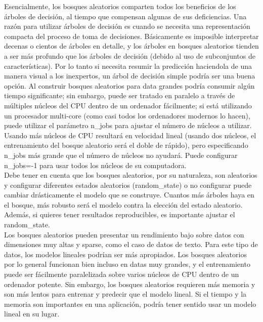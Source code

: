 { 
 Esencialmente, los bosques aleatorios comparten todos los beneficios de los árboles de decisión, al tiempo que compensan algunas de sus deficiencias.  Una razón para  utilizar árboles de decisión es cuando se necesita una representación compacta del proceso de toma de decisiones.  Básicamente es imposible interpretar decenas o cientos de árboles en detalle, y los árboles en bosques aleatorios tienden a ser más profundo que los árboles de decisión (debido al uso de subconjuntos de características).  Por lo tanto si necesita resumir la predicción haciendola de una manera visual a los inexpertos, un árbol de decisión simple podría ser una buena opción.   Al construir bosques aleatorios para data grandes podría consumir algún  tiempo significante; sin embargo, puede ser tratado en paralelo a través de múltiples núcleos del CPU dentro de un ordenador fácilmente;  si está utilizando un procesador multi-core (como casi todos los ordenadores modernos lo hacen), puede utilizar el parámetro {\ttfamily n\_jobs} para ajustar el número de núcleos a utilizar. Usando más núcleos de CPU resultará en velocidad lineal (usando dos núcleos, el entrenamiento del bosque aleatorio será el doble de rápido), pero especificando {\ttfamily n\_jobs} más grande que el número de núcleos no ayudará. Puede configurar {\ttfamily n\_jobs=-1}  para usar todos los núcleos de su computadora.\\



 Debe tener en cuenta que los bosques aleatorios, por su naturaleza, son aleatorios y configurar
 diferentes estados aleatorios ({\ttfamily random\_state}) o no configurar  puede cambiar drásticamente 
 el modelo que se construye. Cuantos más árboles haya en el bosque, más robusto será el modelo contra la elección del estado aleatorio.  Además, si quieres tener resultados reproducibles, es importante ajustar el random\_state.\\


Los bosques aleatorios  pueden presentar un  rendimiento bajo sobre datos con dimensiones muy altas y sparse, como el caso de  datos de texto. Para este tipo de datos, los modelos lineales podrían ser más apropiados. Los bosques aleatorios por lo general funcionan bien incluso en datas muy grandes, y  el entrenamiento puede ser fácilmente paralelizada sobre varios núcleos de CPU dentro de un ordenador potente. Sin embargo,  los bosques aleatorios requieren más memoria y son más lentos para entrenar y predecir que el modelo lineal.  Si el tiempo y la memoria son importantes en una aplicación, podría tener sentido usar un
modelo lineal en su lugar. \\


}
